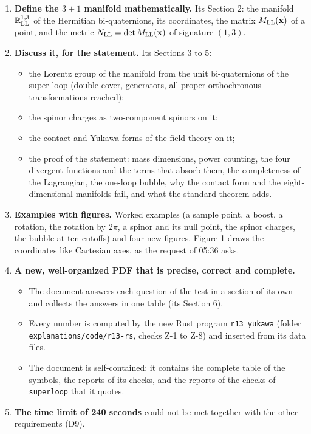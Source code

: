 \documentclass[
  10pt,
]{article}
\providecommand{\tightlist}{%
  \setlength{\itemsep}{0pt}\setlength{\parskip}{0pt}}
\begin{document}
\begin{enumerate}
\def\labelenumi{\arabic{enumi}.}
\tightlist
\item
  \textbf{Define the \(3+1\) manifold mathematically.} Its Section 2:
  the manifold \(\mathbb R^{1,3}_{\rm LL}\) of the Hermitian
  bi-quaternions, its coordinates, the matrix \(M_{\rm LL}(\mathbf x)\)
  of a point, and the metric \(N_{\rm LL}=\det M_{\rm LL}(\mathbf x)\)
  of signature \((1,3)\).
\item
  \textbf{Discuss it, for the statement.} Its Sections 3 to 5:

  \begin{itemize}
  \tightlist
  \item
    the Lorentz group of the manifold from the unit bi-quaternions of
    the super-loop (double cover, generators, all proper orthochronous
    transformations reached);
  \item
    the spinor charges as two-component spinors on it;
  \item
    the contact and Yukawa forms of the field theory on it;
  \item
    the proof of the statement: mass dimensions, power counting, the
    four divergent functions and the terms that absorb them, the
    completeness of the Lagrangian, the one-loop bubble, why the contact
    form and the eight-dimensional manifolds fail, and what the standard
    theorem adds.
  \end{itemize}
\item
  \textbf{Examples with figures.} Worked examples (a sample point, a
  boost, a rotation, the rotation by \(2\pi\), a spinor and its null
  point, the spinor charges, the bubble at ten cutoffs) and four new
  figures. Figure 1 draws the coordinates like Cartesian axes, as the
  request of 05:36 asks.
\item
  \textbf{A new, well-organized PDF that is precise, correct and
  complete.}

  \begin{itemize}
  \tightlist
  \item
    The document answers each question of the test in a section of its
    own and collects the answers in one table (its Section 6).
  \item
    Every number is computed by the new Rust program
    \texttt{r13\_yukawa} (folder \texttt{explanations/code/r13-rs},
    checks Z-1 to Z-8) and inserted from its data files.
  \item
    The document is self-contained: it contains the complete table of
    the symbols, the reports of its checks, and the reports of the
    checks of \texttt{superloop} that it quotes.
  \end{itemize}
\item
  \textbf{The time limit of 240 seconds} could not be met together with
  the other requirements (D9).
\end{enumerate}
\end{document}
